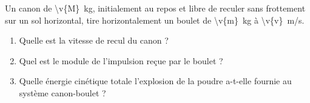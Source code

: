Un canon de \qty{\v{M}}{kg}, initialement au repos et libre de reculer sans frottement sur un sol horizontal, tire horizontalement un boulet de \qty{\v{m}}{kg} à \qty{\v{v}}{m/s}.

\begin{enumerate}[label=\alph*)]
    \item Quelle est la vitesse de recul du canon ?
    \item Quel est le module de l'impulsion reçue par le boulet ?
    \item Quelle énergie cinétique totale l'explosion de la poudre a-t-elle fournie au système canon-boulet ?
\end{enumerate}
